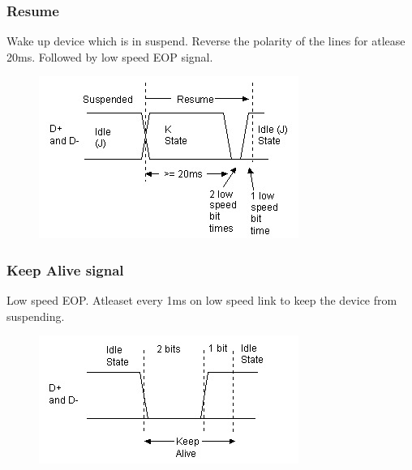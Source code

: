 \documentclass{article}
\begin{document}
\subsubsection{Resume}
Wake up device which is in suspend.
Reverse the polarity of the lines for atlease 20ms.
Followed by low speed EOP signal.

\begin{figure}[H]
    \begin{center}
        \includegraphics[scale=0.5]{DocuResources/resumesignal.jpg}
    \end{center}
\end{figure}

\subsubsection{Keep Alive signal}
Low speed EOP.
Atleaset every 1ms on low speed link to keep the device from suspending.
\begin{figure}[H]
    \begin{center}
        \includegraphics[scale=0.5]{DocuResources/KEEPAlige.jpg}
    \end{center}
\end{figure}
\end{document}
